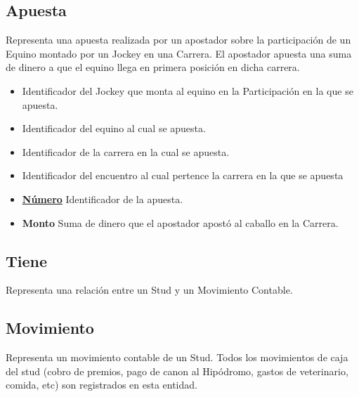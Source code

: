 \documentclass[a4paper,11pt]{article}
\begin{document}
\subsection{Apuesta}

Representa una apuesta realizada por un apostador sobre la participación de un Equino
montado por un Jockey en una Carrera. El apostador apuesta una suma de dinero a que
el equino llega en primera posición en dicha carrera.

\begin{itemize}

  \item \textbf{\uline{}} Identificador del Jockey que monta
    al equino en la Participación en la que se apuesta.

  \item \textbf{\uline{}} Identificador del equino al cual
    se apuesta.
  
  \item \textbf{\uline{}} Identificador de la carrera en la 
    cual se apuesta.
  
  \item \textbf{\uline{}} Identificador del encuentro
    al cual pertence la carrera en la que se apuesta

  \item \textbf{\uline{Número}} Identificador de la apuesta.

  \item \textbf{Monto} Suma de dinero que el apostador apostó al caballo en la
    Carrera.

\end{itemize}

\subsection{Tiene}

Representa una relación entre un Stud y un Movimiento Contable.

\subsection{Movimiento}

Representa un movimiento contable de un Stud. Todos los movimientos de caja
del stud (cobro de premios, pago de canon al Hipódromo, gastos de veterinario, 
comida, etc) son registrados en esta entidad.
\end{document}

